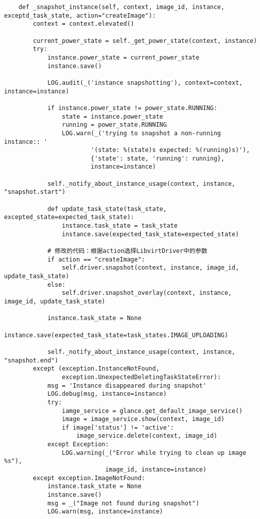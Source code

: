 \documentclass[a4paper,left=1.5cm,right=1.5cm,11pt]{article}
\begin{document}
    \begin{lstlisting}
    def _snapshot_instance(self, context, image_id, instance, exceptd_task_state, action="createImage"):
        context = context.elevated()

        current_power_state = self._get_power_state(context, instance)
        try:
            instance.power_state = current_power_state
            instance.save()

            LOG.audit(_('instance snapshotting'), context=context, instance=instance)

            if instance.power_state != power_state.RUNNING:
                state = instance.power_state
                running = power_state.RUNNING
                LOG.warn(_('trying to snapshot a non-running instance:: '
                        '(state: %(state)s expected: %(running)s)'),
                        {'state': state, 'running': running},
                        instance=instance)

            self._notify_about_instance_usage(context, instance, "snapshot.start")
        
            def update_task_state(task_state, excepted_state=expected_task_state):
                instance.task_state = task_state
                instance.save(expected_task_state=expected_state)
            
            # 修改的代码：根据action选择LibvirtDriver中的参数
            if action == "createImage":
                self.driver.snapshot(context, instance, image_id, update_task_state)
            else:
                self.driver.snapshot_overlay(context, instance, image_id, update_task_state)
            
            instance.task_state = None
            instance.save(expected_task_state=task_states.IMAGE_UPLOADING)

            self._notify_about_instance_usage(context, instance, "snapshot.end")
        except (exception.InstanceNotFound,
                exception.UnexpectedDeletingTaskStateError):
            msg = 'Instance disappeared during snapshot'
            LOG.debug(msg, instance=instance)
            try:
                iamge_service = glance.get_default_image_service()
                image = image_service.show(context, image_id)
                if image['status'] != 'active':
                    image_service.delete(context, image_id)
            except Exception:
                LOG.warning(_("Error while trying to clean up image %s"),
                            image_id, instance=instance)
        except exception.ImageNotFound:
            instance.task_state = None
            instance.save()
            msg = _("Image not found during snapshot")
            LOG.warn(msg, instance=instance)
    \end{lstlisting}
\end{document}
